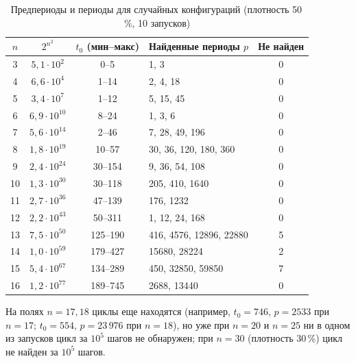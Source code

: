 \documentclass[a4paper,14pt]{extarticle}
\begin{document}
\begin{table}[H]
	\centering
	\caption{Предпериоды и периоды для случайных конфигураций (плотность 50\,\%, 10 запусков)}
	\label{tab:periods}
	\begin{tabular}{|c|c|c|l|c|}
		\hline
		$n$ & $2^{n^2}$ & $t_0$ (мин--макс) & Найденные периоды $p$ & Не найден \\
		\hline
		3  & $5{,}1 \cdot 10^{2}$  & 0--5     & 1, 3                  & 0 \\
		4  & $6{,}6 \cdot 10^{4}$  & 1--14    & 2, 4, 18              & 0 \\
		5  & $3{,}4 \cdot 10^{7}$  & 1--12    & 5, 15, 45             & 0 \\
		6  & $6{,}9 \cdot 10^{10}$ & 8--24    & 1, 3, 6               & 0 \\
		7  & $5{,}6 \cdot 10^{14}$ & 2--46    & 7, 28, 49, 196        & 0 \\
		8  & $1{,}8 \cdot 10^{19}$ & 10--57   & 30, 36, 120, 180, 360 & 0 \\
		9  & $2{,}4 \cdot 10^{24}$ & 30--154  & 9, 36, 54, 108        & 0 \\
		10 & $1{,}3 \cdot 10^{30}$ & 30--118  & 205, 410, 1640        & 0 \\
		11 & $2{,}7 \cdot 10^{36}$ & 47--139  & 176, 1232             & 0 \\
		12 & $2{,}2 \cdot 10^{43}$ & 50--311  & 1, 12, 24, 168        & 0 \\
		13 & $7{,}5 \cdot 10^{50}$ & 125--190 & 416, 4576, 12896, 22880 & 5 \\
		14 & $1{,}0 \cdot 10^{59}$ & 179--427 & 15680, 28224          & 2 \\
		15 & $5{,}4 \cdot 10^{67}$ & 134--289 & 450, 32850, 59850     & 7 \\
		16 & $1{,}2 \cdot 10^{77}$ & 189--745 & 2688, 13440           & 0 \\
		\hline
	\end{tabular}
\end{table}

На полях $n = 17, 18$ циклы еще находятся (например, $t_0 = 746$, $p = 2533$ при $n = 17$; $t_0 = 554$, $p = 23\,976$ при $n = 18$), но уже при $n = 20$ и $n = 25$ ни в одном из запусков цикл за $10^5$ шагов не обнаружен; при $n = 30$ (плотность 30\,\%) цикл не найден за $10^5$ шагов.
\end{document}
